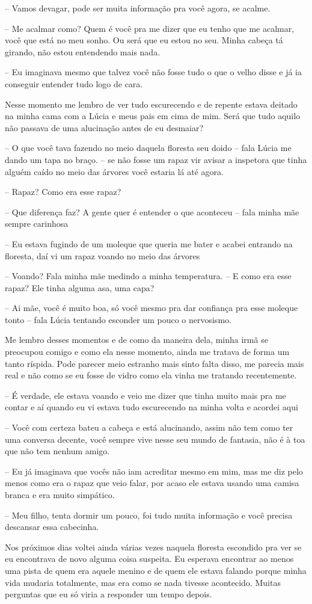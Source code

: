 -- Vamos devagar, pode ser muita informação pra você agora, se acalme.

-- Me acalmar como? Quem é você pra me dizer que eu tenho que me acalmar, você que está no meu sonho. Ou será que eu estou no seu. Minha cabeça tá girando, não estou entendendo mais nada.

-- Eu imaginava mesmo que talvez você não fosse tudo o que o velho disse e já ia conseguir entender tudo logo de cara.

Nesse momento me lembro de ver tudo escurecendo e de repente estava deitado na minha cama com a Lúcia e meus pais em cima de mim. Será que tudo aquilo não passava de uma alucinação antes de eu desmaiar?

-- O que você tava fazendo no meio daquela floresta seu doido -- fala Lúcia me dando um tapa no braço. -- se não fosse um rapaz vir avisar a inspetora que tinha alguém caído no meio das árvores você estaria lá até agora.

-- Rapaz? Como era esse rapaz?

-- Que diferença faz? A gente quer é entender o que aconteceu -- fala minha mãe sempre carinhosa

-- Eu estava fugindo de um moleque que queria me bater e acabei entrando na floresta, daí vi um rapaz voando no meio das árvores

-- Voando? Fala minha mãe medindo a minha temperatura. -- E como era esse rapaz? Ele tinha alguma asa, uma capa?

-- Ai mãe, você é muito boa, só você mesmo pra dar confiança pra esse moleque tonto -- fala Lúcia tentando esconder um pouco o nervosismo.

Me lembro desses momentos e de como da maneira dela, minha irmã se preocupou comigo e como ela nesse momento, ainda me tratava de forma um tanto ríspida. Pode parecer meio estranho mais sinto falta disso, me parecia mais real e não como se eu fosse de vidro como ela vinha me tratando recentemente.

-- É verdade, ele estava voando e veio me dizer que tinha muito mais pra me contar e aí quando eu vi estava tudo escurecendo na minha volta e acordei aqui

-- Você com certeza bateu a cabeça e está alucinando, assim não tem como ter uma conversa decente, você sempre vive nesse seu mundo de fantasia, não é à toa que não tem nenhum amigo.

-- Eu já imaginava que vocês não iam acreditar mesmo em mim, mas me diz pelo menos como era o rapaz que veio falar, por acaso ele estava usando uma camisa branca e era muito simpático.

-- Meu filho, tenta dormir um pouco, foi tudo muita informação e você precisa descansar essa cabecinha.


Nos próximos dias voltei ainda várias vezes naquela floresta escondido pra ver se eu encontrava de novo alguma coisa suspeita. Eu esperava encontrar ao menos uma pista de quem era aquele menino e de quem ele estava falando porque minha vida mudaria totalmente, mas era como se nada tivesse acontecido. Muitas perguntas que eu só viria a responder um tempo depois.




